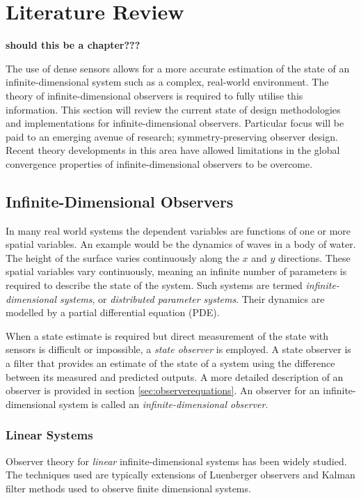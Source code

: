 \section{Literature Review}
\textbf{should this be a chapter???}

The use of dense sensors allows for a more accurate estimation of the state of an infinite-dimensional system such as a complex, real-world environment. The theory of infinite-dimensional observers is required to fully utilise this information. This section will review the current state of design methodologies and implementations for infinite-dimensional observers. Particular focus will be paid to an emerging avenue of research; symmetry-preserving observer design. Recent theory developments in this area have allowed limitations in the global convergence properties of infinite-dimensional observers to be overcome.

\subsection{Infinite-Dimensional Observers}
In many real world systems the dependent variables are functions of one or more spatial variables. An example would be the dynamics of waves in a body of water. The height of the surface varies continuously along the $x$ and $y$ directions. These spatial variables vary continuously, meaning an infinite number of parameters is required to describe the state of the system. Such systems are termed \textit{infinite-dimensional systems}, or \textit{distributed parameter systems}. Their dynamics are modelled by a partial differential equation (PDE). 

When a state estimate is required but direct measurement of the state with sensors is difficult or impossible, a \textit{state observer} is employed. A state observer is a filter that provides an estimate of the state of a system using the difference between its measured and predicted outputs. A more detailed description of an observer is provided in section \ref{sec:observerequations}. An observer for an infinite-dimensional system is called an \textit{infinite-dimensional observer}.

\subsubsection{Linear Systems}
Observer theory for \textit{linear} infinite-dimensional systems has been widely studied. The techniques used are typically extensions of Luenberger observers and Kalman filter methods used to observe finite dimensional systems.

